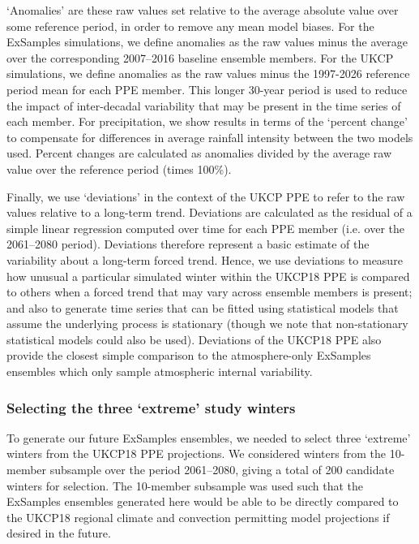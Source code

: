       `Anomalies' are these raw values set relative to the average absolute value over some reference period, in order to remove any mean model biases. For the ExSamples simulations, we define anomalies as the raw values minus the average over the corresponding 2007--2016 baseline ensemble members. For the UKCP simulations, we define anomalies as the raw values minus the 1997-2026 reference period mean for each PPE member. This longer 30-year period is used to reduce the impact of inter-decadal variability that may be present in the time series of each member. For precipitation, we show results in terms of the `percent change' to compensate for differences in average rainfall intensity between the two models used. Percent changes are calculated as anomalies divided by the average raw value over the reference period (times 100\%).

      Finally, we use `deviations' in the context of the UKCP PPE to refer to the raw values relative to a long-term trend. Deviations are calculated as the residual of a simple linear regression computed over time for each PPE member (i.e. over the 2061--2080 period). Deviations therefore represent a basic estimate of the variability about a long-term forced trend. Hence, we use deviations to measure how unusual a particular simulated winter within the UKCP18 PPE is compared to others when a forced trend that may vary across ensemble members is present; and also to generate time series that can be fitted using statistical models that assume the underlying process is stationary (though we note that non-stationary statistical models could also be used). Deviations of the UKCP18 PPE also provide the closest simple comparison to the atmosphere-only ExSamples ensembles which only sample atmospheric internal variability.
  
    \subsubsection{Selecting the three `extreme' study winters}

      To generate our future ExSamples ensembles, we needed to select three `extreme' winters from the UKCP18 PPE projections. We considered winters from the 10-member subsample over the period 2061--2080, giving a total of 200 candidate winters for selection. The 10-member subsample was used such that the ExSamples ensembles generated here would be able to be directly compared to the UKCP18 regional climate and convection permitting model projections if desired in the future.

